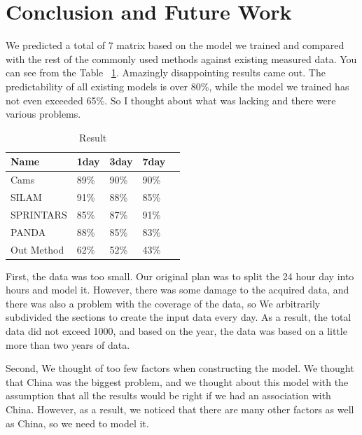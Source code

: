 \documentclass{kcc}
\begin{document}
\section{Conclusion and Future Work}
We predicted a total of 7 matrix based on the model we trained and compared with the rest of the commonly used methods against existing measured data.
You can see from the Table ~\ref{tab:result}. Amazingly disappointing results came out. The predictability of all existing models is over 80\%, while the model we trained has not even exceeded 65\%.
So I thought about what was lacking and there were various problems.

\begin{table}[h!]
  \caption{Result}
  \centering
  \scriptsize 
  \begin{tabular}{l l l l l} \toprule 
    Name & 1day & 3day & 7day \\
    \midrule
    Cams & 89\% &  90\% & 90\%\\
    \midrule
    SILAM & 91\% & 88\% & 85\%\\
    \midrule
    SPRINTARS & 85\% & 87\% & 91\%\\
    \midrule
    PANDA & 88\% & 85\% & 83\%\\
    \midrule
    Out Method & 62\% & 52\% & 43\% \\
    \bottomrule
  \end{tabular}
  \label{tab:result}
\end{table}

First, the data was too small. Our original plan was to split the 24 hour day into hours and model it. However, there was some damage to the acquired data, and there was also a problem with the coverage of the data, so We arbitrarily subdivided the sections to create the input data every day. As a result, the total data did not exceed 1000, and based on the year, the data was based on a little more than two years of data.

Second, We thought of too few factors when constructing the model. We thought that China was the biggest problem, and we thought about this model with the assumption that all the results would be right if we had an association with China. However, as a result, we noticed that there are many other factors as well as China, so we need to model it.
\end{document}
